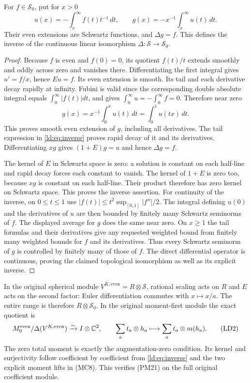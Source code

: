 \begin{theorem}
For $f\in\mathscr S_0$, put for $x>0$
\[
 u(x)=-\int_x^\infty f(t)t^{-1}\,dt,
 \qquad g(x)=-x^{-1}\int_x^\infty u(t)\,dt.
 \tag{LD1}\label{ld:eq:inverse}
\]
Their even extensions are Schwartz functions, and $\Delta g=f$.
This defines the inverse of the continuous linear isomorphism
$\Delta:\mathscr S\to\mathscr S_0$.
\end{theorem}
\begin{proof}
Because $f$ is even and $f(0)=0$, its quotient $f(t)/t$ extends
smoothly and oddly across zero and vanishes there. Differentiating
the first integral gives $u'=f/x$, hence $Eu=f$. Its even extension
is smooth. Its tail and each derivative decay rapidly at infinity.
Fubini is valid since the corresponding double absolute integral
equals $\int_0^\infty|f(t)|dt$, and gives
$\int_0^\infty u=-\int_0^\infty f=0$. Therefore near zero
\[
 g(x)=x^{-1}\int_0^xu(t)\,dt=\int_0^1u(tx)\,dt.
\]
This proves smooth even extension of $g$, including all derivatives.
The tail expression in \eqref{ld:eq:inverse} proves rapid decay of
it and its derivatives. Differentiating $xg$ gives
$(1+E)g=u$ and hence $\Delta g=f$.

The kernel of $E$ in Schwartz space is zero: a solution is constant
on each half-line and rapid decay forces each constant to vanish.
The kernel of $1+E$ is zero too, because $xg$ is constant on each
half-line. Their product therefore has zero kernel on Schwartz
space. This proves the inverse assertion.
For continuity of the inverse, on $0\le t\le1$ use
$|f(t)|\le t^2\sup_{[0,1]}|f''|/2$. The integral defining
$u(0)$ and the derivatives of $u$ are then bounded by finitely
many Schwartz seminorms of $f$. The displayed average for $g$
does the same near zero. On $x\ge1$ the tail formulas and their
derivatives give any requested weighted bound from finitely many
weighted bounds for $f$ and its derivatives. Thus every Schwartz
seminorm of $g$ is controlled by finitely many of those of $f$.
The direct differential operator is continuous, proving the
claimed topological isomorphism as well as its explicit inverse.
\end{proof}

In the original spherical module
$V^{K,\mathrm{even}}=R\otimes\mathscr S$, rational scaling acts
on $R$ and $E$ acts on the second factor: Euler differentiation
commutes with $x\mapsto x/a$. The entire range is therefore
$R\otimes\mathscr S_0$. In the original moment-first module
the exact quotient is
\[
 M_0^{\mathrm{even}}/\Delta(V^{K,\mathrm{even}})
     \xrightarrow{\sim}I\otimes\mathbb C^2,
 \qquad\sum_at_a\otimes h_a\longmapsto
                        \sum_at_a\otimes m(h_a).
 \tag{LD2}\label{ld:eq:adelic-cokernel}
\]
The zero total moment is exactly the augmentation-zero condition.
Its kernel and surjectivity follow coefficient by coefficient from
\eqref{ld:eq:inverse} and the two explicit moment lifts in (MC8).
This verifies (PM21) on the full original coefficient module.

